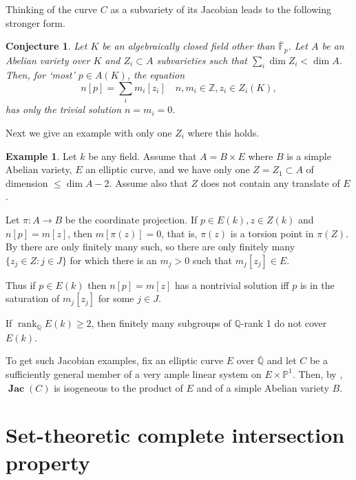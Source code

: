 \documentclass{amsart}
\newtheorem{conj}[thm]{Conjecture}
\theoremstyle{definition}
\newtheorem{exmp}[thm]{Example}
\theoremstyle{remark}
\newcommand{\z}[0]{{\mathbb Z}}
\newcommand{\p}[0]{{\mathbb P}}
\newcommand{\f}[0]{{\mathbb F}}
\newcommand{\q}[0]{{\mathbb Q}}
\newcommand{\qrank}[0]{\operatorname{rank}_{\q}}
\newcommand{\jacs}[0]{\operatorname{\mathbf{Jac}}}
\newcommand{\tsum}[0]{\textstyle{\sum}}
\begin{document}
Thinking of the curve $C$ as a subvariety of its Jacobian leads to the following stronger form.


\begin{conj}\label{few.zeros.conj.1}
 Let $K$ be an algebraically closed field other than $\bar\f_p$. Let $A$ be an Abelian variety over $K$ and $Z_i\subset A$ subvarieties such that $\sum_i\dim Z_i<\dim A$.
Then, for `most' $p\in A(K)$, the equation
$$
n[p]=\tsum_i m_i[z_i]  \quad  n, m_i\in \z, z_i\in Z_i(K),
$$
has only the trivial solution  $n=m_i=0$. 
\end{conj}


Next we give an example with only one $Z_i$ where this holds.

\begin{exmp} Let $k$ be any field. Assume that $A=B\times E$ where $B$ is a  simple Abelian variety, $E$ an elliptic curve, and  we have only one $Z=Z_1\subset A$ of dimension $\leq \dim A -2$. Assume also that $Z$ does not contain any translate of $E$.


Let $\pi:A\to B$ be the coordinate projection.
If $p\in E(k), z\in Z(k)$ and $n[p]=m[z]$, then $m[\pi(z)]=0$, that is, $\pi(z)$ is a torsion point in $\pi(Z)$. By  \cite{MR1609518} there are only finitely many such,
so there are only finitely many  $\{z_j\in Z: j\in J\}$ for which there is an 
 $m_j> 0$  such that $m_j[z_j]\in E$. 

Thus if $p\in E(k)$ then   $n[p]=m[z]$ has a nontrivial solution  
iff $p$ is in the saturation of  $m_j[z_j]$ for some $j\in J$. 

If $\qrank E(k)\geq 2$, then finitely many subgroups of $\q$-rank 1 do not cover $E(k)$. 

To get such Jacobian examples, fix an elliptic curve $E$ over $\bar \q$ and
let $C$ be a sufficiently general member of a very ample linear system on $E\times \p^1$.  Then, by \cite[1.6]{koch-fl}, $\jacs(C)$ is isogeneous to  the product of $E$ and of a  simple Abelian variety $B$. 
\end{exmp}




\section{Set-theoretic complete intersection property}\label{set.ci.prop.sec}
\end{document}
